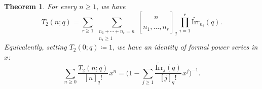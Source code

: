 \documentclass[pdftex]{sigma}
\numberwithin{equation}{section}
\newcommand{\ssp}{\hspace{1pt}}
\newtheorem{Theorem}{Theorem}[section]
\theoremstyle{definition}
\begin{document}
\begin{Theorem}\label{thm:q_exponential_first_return}
	For every $n\ge1$, we have
	\begin{equation}\label{eq:q_composition}
		T_2(n;q)
		=\sum_{r\ge1}\, \sum_{\substack{n_1+\cdots+n_r=n\\ n_i\ge1}}
		{n\brack n_1,\dots,n_r}_q\,
		\prod_{i=1}^{r}\widetilde{\mathrm{Irr}}_{n_i}(q).
	\end{equation}
	Equivalently, setting $T_2(0;q)\coloneqq1$, we have an identity of
	formal power series in $x$:
	\begin{equation}\label{eq:q_exponential_first_return}
		\sum_{n\ge0}\frac{T_2(n;q)}{[n]_q!}\ssp x^n
		=\biggl(1-\sum_{j\ge1}
		\frac{\widetilde{\mathrm{Irr}}_j(q)}{[j]_q!}\ssp x^j\biggr)^{-1}.
	\end{equation}
\end{Theorem}
\end{document}
